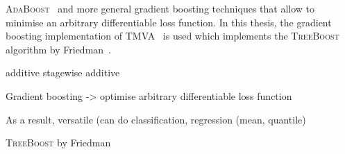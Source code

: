
\textsc{AdaBoost}~\cite{freund_shapire:adaboost,freund_shapire:adaboost2} and
more general gradient boosting techniques that allow to minimise an arbitrary
differentiable loss function.  In this thesis, the gradient boosting
implementation of TMVA~\cite{TMVA} is used which implements the
\textsc{TreeBoost} algorithm by Friedman~\cite{Friedman:2001wbq}.


additive stagewise additive

Gradient boosting -> optimise arbitrary differentiable loss function

As a result, versatile (can do classification, regression (mean, quantile)



\textsc{TreeBoost} by Friedman~\cite{Friedman:2000,Friedman:2001wbq}



